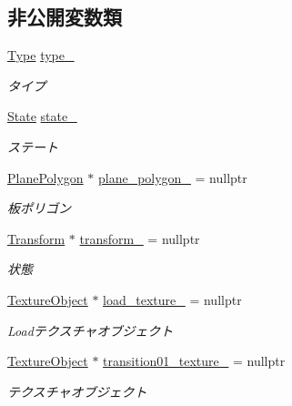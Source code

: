 \subsection*{非公開変数類}
\begin{DoxyCompactItemize}
\item 
\mbox{\hyperlink{class_fade_ac06f27215b454aa05b93c236476d6e80}{Type}} \mbox{\hyperlink{class_fade_a1d04a65762c863a1d3571f0e1d47532a}{type\+\_\+}}
\begin{DoxyCompactList}\small\item\em タイプ \end{DoxyCompactList}\item 
\mbox{\hyperlink{class_fade_ae77826bf3ff2ab95fb7b3b6f95cba80a}{State}} \mbox{\hyperlink{class_fade_ad5ff5a5645edb88fd5544819077ff13f}{state\+\_\+}}
\begin{DoxyCompactList}\small\item\em ステート \end{DoxyCompactList}\item 
\mbox{\hyperlink{class_plane_polygon}{Plane\+Polygon}} $\ast$ \mbox{\hyperlink{class_fade_ab51b04ff5e6225016ccb012fce80dd74}{plane\+\_\+polygon\+\_\+}} = nullptr
\begin{DoxyCompactList}\small\item\em 板ポリゴン \end{DoxyCompactList}\item 
\mbox{\hyperlink{class_transform}{Transform}} $\ast$ \mbox{\hyperlink{class_fade_a3f99d8f5316d5461ea7197aed18c4417}{transform\+\_\+}} = nullptr
\begin{DoxyCompactList}\small\item\em 状態 \end{DoxyCompactList}\item 
\mbox{\hyperlink{class_texture_object}{Texture\+Object}} $\ast$ \mbox{\hyperlink{class_fade_a5bdc7ea6de7666601fa363e503ccc181}{load\+\_\+texture\+\_\+}} = nullptr
\begin{DoxyCompactList}\small\item\em Loadテクスチャオブジェクト \end{DoxyCompactList}\item 
\mbox{\hyperlink{class_texture_object}{Texture\+Object}} $\ast$ \mbox{\hyperlink{class_fade_a4ff29d821f15a33e2110acc03c8d8a84}{transition01\+\_\+texture\+\_\+}} = nullptr
\begin{DoxyCompactList}\small\item\em テクスチャオブジェクト \end{DoxyCompactList}\item 

\end{DoxyCompactItemize}
